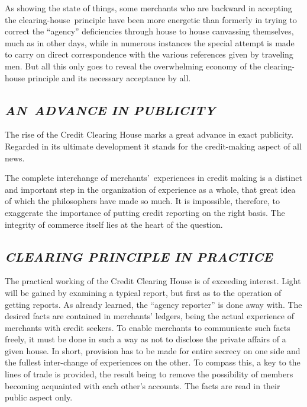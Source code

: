 \documentclass[openany,nobib]{tufte-book}
\begin{document}
As showing the state of things, some merchants who are backward in
accepting the clearing-house~principle have been more energetic than
formerly in trying to correct the ``agency'' deficiencies through house
to house canvassing themselves, much as in other days, while in numerous
instances the special attempt is made to carry on direct correspondence
with the various references given by traveling men. But all this only
goes to reveal the overwhelming economy of the clearing-house principle
and its necessary acceptance by all.~

\hypertarget{an-advance-in-publicity}{%
\subsection{\texorpdfstring{\emph{AN~ADVANCE IN
PUBLICITY}}{AN~ADVANCE IN PUBLICITY}}\label{an-advance-in-publicity}}

The rise of the Credit Clearing House marks a great advance in exact
publicity. Regarded in its ultimate development it stands for the
credit-making aspect of all news.~

The complete interchange of merchants'~experiences in credit making is a
distinct and important step in the organization of experience as a
whole, that great idea of which the philosophers have made so much. It
is impossible, therefore, to exaggerate the importance of putting credit
reporting on the right basis. The integrity of commerce itself lies at
the heart of the question.~

\hypertarget{clearing-principle-in-practice}{%
\subsection{\texorpdfstring{\emph{CLEARING PRINCIPLE IN
PRACTICE}~}{CLEARING PRINCIPLE IN PRACTICE~}}\label{clearing-principle-in-practice}}

The practical working of the Credit Clearing House is of exceeding
interest. Light will be gained by examining a typical report, but first
as to the operation of getting reports. As already learned, the ``agency
reporter'' is done away with. The desired facts are contained in
merchants' ledgers, being the actual experience of merchants with credit
seekers. To enable merchants to communicate such facts freely, it must
be done in such a way as not to disclose the private affairs of a given
house. In short, provision has to be made for entire secrecy on one side
and the fullest inter-change of experiences on the other. To compass
this, a key to the lines of trade is provided, the result being to
remove the possibility of members becoming acquainted with each other's
accounts. The facts are read in their public aspect only.~
\end{document}
